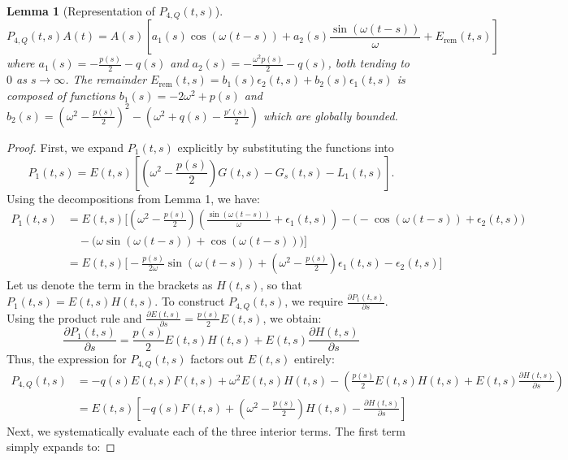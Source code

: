 \documentclass[10pt,reqno]{amsart}
\newtheorem{lemma}[theorem]{Lemma}
\theoremstyle{definition}
\begin{document}
	\vspace{0.5cm}
	
	\begin{lemma}[Representation of $P_{4,Q}(t,s)$]
		\[ P_{4,Q}(t,s)A(t) = A(s)\left[ a_1(s)\cos(\omega(t-s)) + a_2(s)\frac{\sin(\omega(t-s))}{\omega} + E_{\text{rem}}(t,s) \right] \]
		where $a_1(s) = -\frac{p(s)}{2} - q(s)$ and $a_2(s) = -\frac{\omega^2 p(s)}{2} - q(s)$, both tending to $0$ as $s \to \infty$. The remainder $E_{\text{rem}}(t,s) = b_1(s)\epsilon_2(t,s) + b_2(s)\epsilon_1(t,s)$ is composed of functions $b_1(s) = -2\omega^2 + p(s)$ and $b_2(s) = \left(\omega^2 - \frac{p(s)}{2}\right)^2 - \left(\omega^2 + q(s) - \frac{p'(s)}{2}\right)$ which are globally bounded. 
	\end{lemma}
	
	\begin{proof}
		First, we expand $P_1(t,s)$ explicitly by substituting the functions into $$P_1(t,s) = E(t,s) \left[ \left(\omega^2 - \frac{p(s)}{2}\right)G(t,s) - G_s(t,s) - L_1(t,s) \right].$$ Using the decompositions from Lemma 1, we have:
		\begin{align*}
			P_1(t,s) &= E(t,s) \bigg[ \left(\omega^2 - \frac{p(s)}{2}\right) \left( \frac{\sin(\omega(t-s))}{\omega} + \epsilon_1(t,s) \right) - \big( -\cos(\omega(t-s)) + \epsilon_2(t,s) \big) \\
			&\quad - \big( \omega \sin(\omega(t-s)) + \cos(\omega(t-s)) \big) \bigg] \\
			&= E(t,s) \bigg[ -\frac{p(s)}{2\omega}\sin(\omega(t-s)) + \left(\omega^2 - \frac{p(s)}{2}\right)\epsilon_1(t,s) - \epsilon_2(t,s) \bigg]
		\end{align*}
		Let us denote the term in the brackets as $H(t,s)$, so that $P_1(t,s) = E(t,s)H(t,s)$. To construct $P_{4,Q}(t,s)$, we require $\frac{\partial P_1(t,s)}{\partial s}$. Using the product rule and $\frac{\partial E(t,s)}{\partial s} = \frac{p(s)}{2}E(t,s)$, we obtain:
		\[ \frac{\partial P_1(t,s)}{\partial s} = \frac{p(s)}{2}E(t,s)H(t,s) + E(t,s)\frac{\partial H(t,s)}{\partial s} \]
		Thus, the expression for $P_{4,Q}(t,s)$ factors out $E(t,s)$ entirely:
		\begin{align*}
			P_{4,Q}(t,s) &= -q(s)E(t,s)F(t,s) + \omega^2 E(t,s)H(t,s) - \left( \frac{p(s)}{2}E(t,s)H(t,s) + E(t,s)\frac{\partial H(t,s)}{\partial s} \right) \\
			&= E(t,s) \left[ -q(s)F(t,s) + \left(\omega^2 - \frac{p(s)}{2}\right)H(t,s) - \frac{\partial H(t,s)}{\partial s} \right]
		\end{align*}
		Next, we systematically evaluate each of the three interior terms. The first term simply expands to:

\end{proof}
\end{document}
